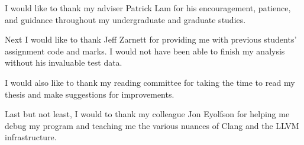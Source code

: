 
I would like to thank my adviser Patrick Lam for his encouragement, patience, and guidance throughout my undergraduate and graduate studies.

Next I would like to thank Jeff Zarnett for providing me with previous students' assignment code and marks. I would not have been able to finish my analysis without his invaluable test data.

I would also like to thank my reading committee for taking the time to read my thesis and make suggestions for improvements.

Last but not least, I would to thank my colleague Jon Eyolfson for helping me debug my program and teaching me the various nuances of Clang and the LLVM infrastructure.
